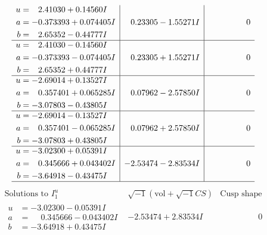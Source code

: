 \documentclass[1p]{elsarticle_modified}
\theoremstyle{definition}
\newcommand{\I}{\sqrt{-1}}
\begin{document}
$$\begin{array}{c|c|c}
\begin{aligned}
u &= \phantom{-}2.41030 + 0.14560 I \\
a &= -0.373393 + 0.074405 I \\
b &= \phantom{-}2.65352 - 0.44777 I\end{aligned}
 & \phantom{-}0.23305 - 1.55271 I & \phantom{-0.000000 } 0 \\ \hline\begin{aligned}
u &= \phantom{-}2.41030 - 0.14560 I \\
a &= -0.373393 - 0.074405 I \\
b &= \phantom{-}2.65352 + 0.44777 I\end{aligned}
 & \phantom{-}0.23305 + 1.55271 I & \phantom{-0.000000 } 0 \\ \hline\begin{aligned}
u &= -2.69014 + 0.13527 I \\
a &= \phantom{-}0.357401 + 0.065285 I \\
b &= -3.07803 - 0.43805 I\end{aligned}
 & \phantom{-}0.07962 - 2.57850 I & \phantom{-0.000000 } 0 \\ \hline\begin{aligned}
u &= -2.69014 - 0.13527 I \\
a &= \phantom{-}0.357401 - 0.065285 I \\
b &= -3.07803 + 0.43805 I\end{aligned}
 & \phantom{-}0.07962 + 2.57850 I & \phantom{-0.000000 } 0 \\ \hline\begin{aligned}
u &= -3.02300 + 0.05391 I \\
a &= \phantom{-}0.345666 + 0.043402 I \\
b &= -3.64918 - 0.43475 I\end{aligned}
 & -2.53474 - 2.83534 I & \phantom{-0.000000 } 0\\
 \hline 
 \end{array}$$\newpage$$\begin{array}{c|c|c}  
\text{Solutions to }I^u_{1}& \I (\text{vol} + \sqrt{-1}CS) & \text{Cusp shape}\\
 \hline 
\begin{aligned}
u &= -3.02300 - 0.05391 I \\
a &= \phantom{-}0.345666 - 0.043402 I \\
b &= -3.64918 + 0.43475 I\end{aligned}
 & -2.53474 + 2.83534 I & \phantom{-0.000000 } 0 \\ \hline\begin{aligned}

\end{aligned}
\end{array}$$
\end{document}
